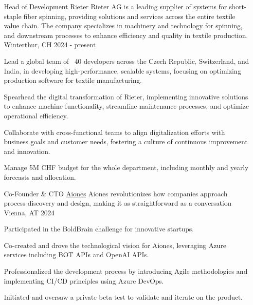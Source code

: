 
\begin{cventries}
  \cventry
    {Head of Development} %
    {\href{https://www.rieter.com}{Rieter}} %
    {Rieter AG is a leading supplier of systems for short-staple fiber spinning, providing solutions and services across the entire textile value chain. The company specializes in machinery and technology for spinning, and downstream processes to enhance efficiency and quality in textile production.} %
    {Winterthur, CH} %
    {2024 - present} %
    {
        \begin{cvitems}
            \item {Lead a global team of ~40 developers across the Czech Republic, Switzerland, and India, in developing high-performance, scalable systems, focusing on optimizing production software for textile manufacturing.}
            \item {Spearhead the digital transformation of Rieter, implementing innovative solutions to enhance machine functionality, streamline maintenance processes, and optimize operational efficiency.}
            \item {Collaborate with cross-functional teams to align digitalization efforts with business goals and customer needs, fostering a culture of continuous improvement and innovation.}
            \item {Manage 5M CHF budget for the whole department, including monthly and yearly forecasts and allocation.}
        \end{cvitems}
    }
  \cventry
  {Co-Founder \& CTO} %
  {\href{https://www.aiones.ai}{Aiones}} %
  {Aiones revolutionizes how companies approach process discovery and design, making it as straightforward as a conversation} %
  {Vienna, AT} %
  {2024} %
  {
    \begin{cvitems} %
      \item {Participated in the BoldBrain challenge for innovative startups.}
      \item {Co-created and drove the technological vision for Aiones, leveraging Azure services including BOT APIs and OpenAI APIs.}
      \item {Professionalized the development process by introducing Agile methodologies and implementing CI/CD principles using Azure DevOps.}
      \item {Initiated and oversaw a private beta test to validate and iterate on the product.}

\end{cvitems}}
\end{cventries}
